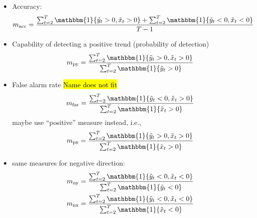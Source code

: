 \documentclass[oneside]{article}
\theoremstyle{plain}%
\theoremstyle{definition}
\newcommand{\ind}[1]{\mathbbm{1}\{#1\}}
\newcommand{\ydiff}{\tilde{y}}
\newcommand{\xdiff}{\tilde{x}}
\begin{document}
\begin{itemize}
  \item Accuracy: \begin{equation}
  	m_{\text{acc}} = \frac{\sum_{t=2}^T \ind{\ydiff_t > 0, \xdiff_t > 0} + \sum_{t=2}^T \ind{\ydiff_t < 0, \xdiff_t < 0}}{T-1}
\end{equation}
	\item Capability of detecting a positive trend (probability of detection)
	\begin{equation}
  		m_{\text{py}} = \frac{\sum_{t=2}^T \ind{\ydiff_t > 0, \xdiff_t > 0}}{\sum_{t=2}^T \ind{\ydiff_t > 0}}
	\end{equation}
	\item False alarm rate \hl{Name does not fit} \begin{equation}
  m_{\text{far}} = \frac{\sum_{t=2}^T \ind{\ydiff_t < 0, \xdiff_t > 0}}{\sum_{t=2}^T \ind{\xdiff_t > 0}}
\end{equation}
maybe use \enquote{positive} measure instead, i.e.,
\begin{equation}
  m_{\text{px}} = \frac{\sum_{t=2}^T \ind{\ydiff_t > 0, \xdiff_t > 0}}{\sum_{t=2}^T \ind{\xdiff_t > 0}}  
\end{equation}
	\item same measures for negative direction:
	\begin{align}
		m_{\text{ny}} &=  \frac{\sum_{t=2}^T \ind{\ydiff_t < 0, \xdiff_t < 0}}{\sum_{t=2}^T \ind{\ydiff_t < 0}} \\
		m_{\text{nx}} &=  \frac{\sum_{t=2}^T \ind{\ydiff_t < 0, \xdiff_t < 0}}{\sum_{t=2}^T \ind{\xdiff_t < 0}}
	\end{align}
\end{itemize}
\end{document}
